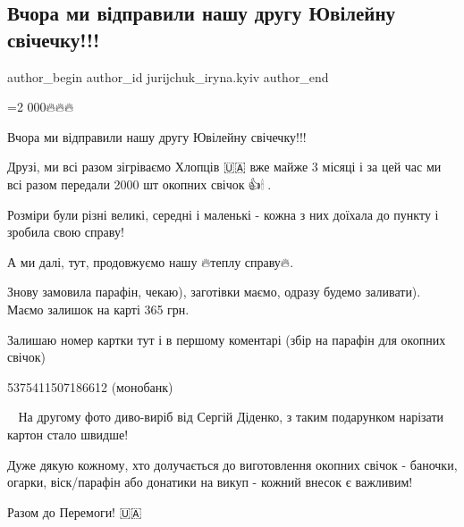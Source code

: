  
 
 
 
 
 
\subsection{Вчора ми відправили нашу другу Ювілейну свічечку!!!}
\label{sec:22_12_2022.fb.jurijchuk_iryna.kyiv.1.svichky}
 
\ifcmt
 author_begin
   author_id jurijchuk_iryna.kyiv
 author_end
\fi

=2 000🔥🔥🔥

Вчора ми відправили нашу другу Ювілейну свічечку!!! 

Друзі, ми всі разом зігріваємо Хлопців 🇺🇦 вже майже 3 місяці і за цей час ми
всі разом передали 2000 шт окопних свічок🤝👍🕯🙂.

Розміри були різні великі, середні і маленькі - кожна з них доїхала до пункту і
зробила свою справу! 

А ми далі, тут, продовжуємо нашу 🔥теплу справу🔥. 

Знову замовила парафін, чекаю), заготівки маємо, одразу будемо заливати). Маємо
залишок на карті 365 грн. 

Залишаю номер картки тут і в першому коментарі (збір на парафін для окопних
свічок) 

5375411507186612 (монобанк) 

💛💙 На другому фото диво-виріб від Сергій Діденко, з таким подарунком нарізати
картон стало швидше! 

Дуже дякую кожному, хто долучається до виготовлення окопних свічок - баночки,
огарки, віск/парафін або донатики на викуп - кожний внесок є важливим! 

Разом до Перемоги! 🇺🇦
